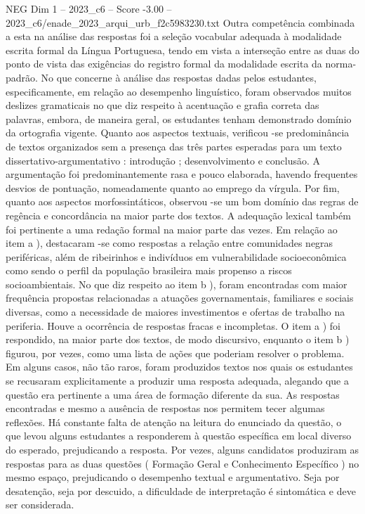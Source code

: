 \begin{textsample}{NEG Dim 1 – 2023\_c6 – Score -3.00 – 2023\_c6/enade\_2023\_arqui\_urb\_f2c5983230.txt}
Outra competência combinada a esta na análise das respostas foi a seleção vocabular adequada à modalidade escrita formal da Língua Portuguesa, tendo em vista a interseção entre as duas do ponto de vista das exigências do registro formal da modalidade escrita da norma-padrão.
No que concerne à análise das respostas dadas pelos estudantes, especificamente, em relação ao desempenho linguístico, foram observados muitos deslizes gramaticais no que diz respeito à acentuação e grafia correta das palavras, embora, de maneira geral, os estudantes tenham demonstrado domínio da ortografia vigente.
Quanto aos aspectos textuais, verificou -se predominância de textos organizados sem a presença das três partes esperadas para um texto dissertativo-argumentativo : introdução ; desenvolvimento e conclusão.
A argumentação foi predominantemente rasa e pouco elaborada, havendo frequentes desvios de pontuação, nomeadamente quanto ao emprego da vírgula.
Por fim, quanto aos aspectos morfossintáticos, observou -se um bom domínio das regras de regência e concordância na maior parte dos textos.
A adequação lexical também foi pertinente a uma redação formal na maior parte das vezes.
Em relação ao item a ), destacaram -se como respostas a relação entre comunidades negras periféricas, além de ribeirinhos e indivíduos em vulnerabilidade socioeconômica como sendo o perfil da população brasileira mais propenso a riscos socioambientais.
No que diz respeito ao item b ), foram encontradas com maior frequência propostas relacionadas a atuações governamentais, familiares e sociais diversas, como a necessidade de maiores investimentos e ofertas de trabalho na periferia.
Houve a ocorrência de respostas fracas e incompletas.
O item a ) foi respondido, na maior parte dos textos, de modo discursivo, enquanto o item b ) figurou, por vezes, como uma lista de ações que poderiam resolver o problema.
Em alguns casos, não tão raros, foram produzidos textos nos quais os estudantes se recusaram explicitamente a produzir uma resposta adequada, alegando que a questão era pertinente a uma área de formação diferente da sua.
As respostas encontradas e mesmo a ausência de respostas nos permitem tecer algumas reflexões.
Há constante falta de atenção na leitura do enunciado da questão, o que levou alguns estudantes a responderem à questão específica em local diverso do esperado, prejudicando a resposta.
Por vezes, alguns candidatos produziram as respostas para as duas questões ( Formação Geral e Conhecimento Específico ) no mesmo espaço, prejudicando o desempenho textual e argumentativo.
Seja por desatenção, seja por descuido, a dificuldade de interpretação é sintomática e deve ser considerada.

\end{textsample}
